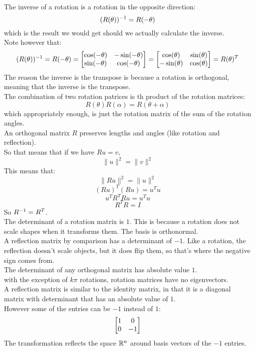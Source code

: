 \documentclass[12pt]{article}
\begin{document}
The inverse of a rotation is a rotation
in the opposite direction:
\[ (R(\theta))^{-1} = R(-\theta) \]
which is the result we would get should we
actually calculate the inverse. \\
Note however that:
\[ (R(\theta))^{-1} = R(-\theta) 
= \begin{bmatrix} {\cos(-\theta)} & {-\sin(-\theta)} \\
{\sin(-\theta)} & {\cos(-\theta)} \end{bmatrix}
= \begin{bmatrix} {\cos(\theta)} & {\sin(\theta)} \\
{-\sin(\theta)} & {\cos(\theta)} \end{bmatrix} = R(\theta)^T \]
The reason the inverse is the transpose 
is because a rotation is orthogonal,
meaning that the inverse is the transpose. \\

The combination of two rotation patrices
is th product of the rotation matrices:
\[ R(\theta)R(\alpha) = R(\theta + \alpha) \]
which appropriately enough, is just the rotation
matrix of the sum of the rotation angles. \\

An orthogonal matrix $R$ preserves lengths and angles
(like rotation and reflection). \\
So that means that if we have $Ru = v$,
\[ \|u\|^2 = \|v\|^2 \]
This means that:
\[ \|Ru\|^2 = \|u\|^2 \]
\[ (Ru)^T(Ru) = u^Tu \]
\[ u^TR^TRu = u^Tu \]
\[ R^TR = I \]
So $R^{-1} = R^T$. \\

The determinant of a rotation matrix
is $1$.
This is because a rotation does not scale
shapes when it transforms them.
The basis is orthonormal. \\

A reflection matrix by comparison has a determinant
of $-1$. 
Like a rotation, the reflection doesn't scale objects,
but it does flip them, so that's where the negative
sign comes from. \\

The determinant of any orthogonal matrix
has absolute value $1$. \\

with the exception of $k\pi$ rotations,
rotation matrices have no eigenvectors. \\

A reflection matrix is similar to the identity
matrix, in that it is a diagonal matrix
with determinant that has an absolute
value of $1$. \\
However some of the entries can be $-1$
instead of $1$:
\[ \begin{bmatrix} {1} & {0} \\ {0} & {-1} \end{bmatrix} \]
The transformation reflects the space $\mathbb{R}^n$
around basis vectors of the $-1$ entries.
\end{document}
